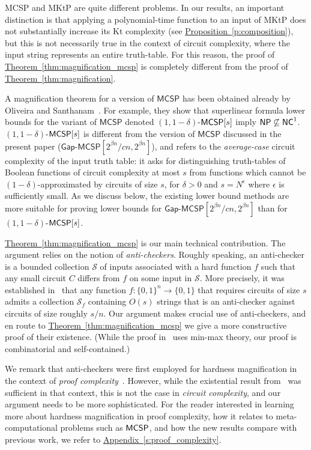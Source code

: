 \documentclass[11pt]{article}
\numberwithin{equation}{section}
\theoremstyle{definition}
\theoremstyle{plain}
\newcommand{\expref}[2]{\hyperref[#2]{#1~\ref{#2}}}
\newcommand{\NC}{\ensuremath{{\sf NC}^1}\xspace}
\newcommand{\NP}{\ensuremath{{\sf NP}}\xspace}
\newcommand{\MCSP}{\ensuremath{{\sf MCSP}}\xspace}
\newcommand{\gapmcsp}{\mathsf{Gap}$-$\mathsf{MCSP}}
\begin{document}
\vspace{0.2cm}

MCSP and MKtP are quite different problems. In our results, an important distinction is that applying a polynomial-time function to an input of MKtP does not substantially increase its Kt complexity (see \expref{Proposition}{p:composition}), but this is not necessarily true in the context of circuit complexity, where the input string represents an entire truth-table. For this reason, the proof of \expref{Theorem}{thm:magnification_mcsp} is completely different from the proof of \expref{Theorem}{thm:magnification}. 

A magnification theorem for a version of $\mathsf{MCSP}$ has been obtained already by Oliveira and Santhanam~\cite{OS18}. For example, they show that superlinear formula lower bounds for the variant of $\mathsf{MCSP}$ denoted $(1,1-\delta)$-$\MCSP[s]$ imply $\NP\not\subseteq\NC$. $(1,1-\delta)$-$\MCSP[s]$ is different from the version of $\mathsf{MCSP}$ discussed in
%
the present paper %
($\gapmcsp[2^{\beta n}/cn, 2^{\beta n}]$), and refers to the \emph{average-case} circuit complexity of the input truth table: it asks for distinguishing truth-tables of Boolean functions of circuit complexity at most $s$ from functions which cannot be $(1-\delta)$-approximated by circuits of size $s$, for $\delta>0$ and $s=N^{\epsilon}$ where $\epsilon$ is sufficiently small. As we discuss below, the existing lower bound methods are more suitable for proving lower bounds for $\gapmcsp[2^{\beta n}/cn, 2^{\beta n}]$ than for $(1,1-\delta)$-$\MCSP[s]$.


\expref{Theorem}{thm:magnification_mcsp} is our main technical contribution.  The argument relies on the notion of \emph{anti-checkers}. Roughly speaking, an anti-checker is a bounded collection $\mathcal{S}$ of inputs associated with a hard function $f$ such that any small circuit $C$ differs from $f$ on some input in $\mathcal{S}$. More precisely, it was established in~\cite{DBLP:conf/stoc/LiptonY94} that any function $f \colon \{0,1\}^n \to \{0,1\}$ that requires circuits of size $s$ admits a collection $\mathcal{S}_f$ containing $O(s)$ strings that is an anti-checker against circuits of size roughly $s/n$. Our argument makes crucial use of anti-checkers, 
and en route to \expref{Theorem}{thm:magnification_mcsp} we give a more constructive proof of their existence. (While the proof in~\cite{DBLP:conf/stoc/LiptonY94} uses min-max theory, our proof is combinatorial and self-contained.) 

We remark that anti-checkers were first employed for hardness magnification in the context of \emph{proof complexity}~\cite{DBLP:journals/eccc/MullerP17}. However, while the existential result from~\cite{DBLP:conf/stoc/LiptonY94} was sufficient in that context, this is not the case in \emph{circuit complexity}, and our argument needs to be more sophisticated. For the reader interested in learning more about hardness magnification in proof complexity, how it relates to meta-computational problems such as \MCSP, and how the new results compare with previous work, we refer to \expref{Appendix}{s:proof_complexity}.
\end{document}
